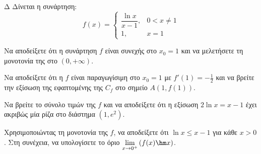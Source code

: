 \begin{thema}{Δ}
Δίνεται η συνάρτηση:
\[ f(x) = \begin{cases} 
\dfrac{\ln x}{x-1}, & 0 < x \neq 1 \\[2ex]
1, & x = 1 
\end{cases} \]
\begin{erwthma}
    \item Να αποδείξετε ότι η συνάρτηση $f$ είναι συνεχής στο $x_0 = 1$ και να μελετήσετε τη μονοτονία της στο $(0, +\infty)$.
    \item Να αποδείξετε ότι η $f$ είναι παραγωγίσιμη στο $x_0 = 1$ με $f'(1) = -\frac{1}{2}$ και να βρείτε την εξίσωση της εφαπτομένης της $C_f$ στο σημείο $A(1, f(1))$.
    \item Να βρείτε το σύνολο τιμών της $f$ και να αποδείξετε ότι η εξίσωση $2\ln x = x - 1$ έχει ακριβώς μία ρίζα στο διάστημα $(1, e^2)$.
    \item Χρησιμοποιώντας τη μονοτονία της $f$, να αποδείξετε ότι $\ln x \le x - 1$ για κάθε $x > 0$. Στη συνέχεια, να υπολογίσετε το όριο $\displaystyle \lim_{x\to 0^+} \left( f(x) \hm x \right)$.
\end{erwthma}
\end{thema}
